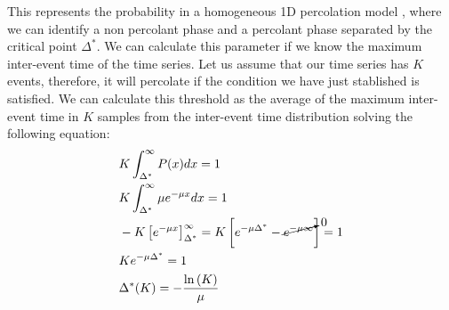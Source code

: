 This represents the probability in a homogeneous 1D percolation model \cite{stauffer2018introduction}, where we can identify a non percolant phase and a percolant phase separated by the
critical point $\Delta^*$. We can calculate this parameter if we know the maximum inter-event time of the time series. Let us assume that our time series has $K$ events, therefore, it will 
percolate if the condition we have just stablished is satisfied. We can calculate this threshold as the average of the maximum inter-event time in $K$ samples from the 
inter-event time distribution solving the following equation:
\begin{equation}
    \begin{split}
        &K\int_{\Delta^*}^{\infty}P(x) dx=1\\
        &K\int_{\Delta^*}^{\infty}\mu e^{-\mu x}dx=1\\
        &-K\left[ e^{-\mu x} \right]_{\Delta^*}^{\infty}=K\left[ e^{-\mu\Delta^*} - \cancelto{0}{e^{-\mu\infty}} \right]=1\\
        &K e^{-\mu\Delta^*}=1\\
        &\Delta^*(K)=-\dfrac{\ln\left(K \right)}{\mu}
    \end{split}
    \label{eq: critical point}
\end{equation}

